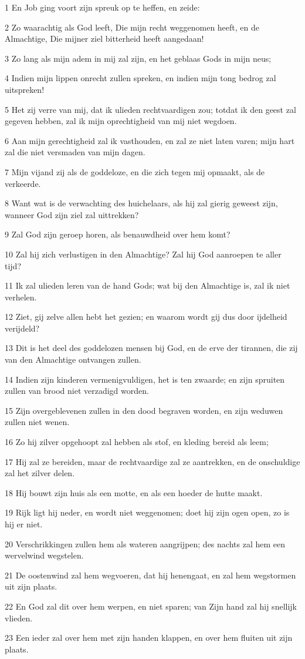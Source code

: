 \par 1 En Job ging voort zijn spreuk op te heffen, en zeide:
\par 2 Zo waarachtig als God leeft, Die mijn recht weggenomen heeft, en de Almachtige, Die mijner ziel bitterheid heeft aangedaan!
\par 3 Zo lang als mijn adem in mij zal zijn, en het geblaas Gods in mijn neus;
\par 4 Indien mijn lippen onrecht zullen spreken, en indien mijn tong bedrog zal uitspreken!
\par 5 Het zij verre van mij, dat ik ulieden rechtvaardigen zou; totdat ik den geest zal gegeven hebben, zal ik mijn oprechtigheid van mij niet wegdoen.
\par 6 Aan mijn gerechtigheid zal ik vasthouden, en zal ze niet laten varen; mijn hart zal die niet versmaden van mijn dagen.
\par 7 Mijn vijand zij als de goddeloze, en die zich tegen mij opmaakt, als de verkeerde.
\par 8 Want wat is de verwachting des huichelaars, als hij zal gierig geweest zijn, wanneer God zijn ziel zal uittrekken?
\par 9 Zal God zijn geroep horen, als benauwdheid over hem komt?
\par 10 Zal hij zich verlustigen in den Almachtige? Zal hij God aanroepen te aller tijd?
\par 11 Ik zal ulieden leren van de hand Gods; wat bij den Almachtige is, zal ik niet verhelen.
\par 12 Ziet, gij zelve allen hebt het gezien; en waarom wordt gij dus door ijdelheid verijdeld?
\par 13 Dit is het deel des goddelozen mensen bij God, en de erve der tirannen, die zij van den Almachtige ontvangen zullen.
\par 14 Indien zijn kinderen vermenigvuldigen, het is ten zwaarde; en zijn spruiten zullen van brood niet verzadigd worden.
\par 15 Zijn overgeblevenen zullen in den dood begraven worden, en zijn weduwen zullen niet wenen.
\par 16 Zo hij zilver opgehoopt zal hebben als stof, en kleding bereid als leem;
\par 17 Hij zal ze bereiden, maar de rechtvaardige zal ze aantrekken, en de onschuldige zal het zilver delen.
\par 18 Hij bouwt zijn huis als een motte, en als een hoeder de hutte maakt.
\par 19 Rijk ligt hij neder, en wordt niet weggenomen; doet hij zijn ogen open, zo is hij er niet.
\par 20 Verschrikkingen zullen hem als wateren aangrijpen; des nachts zal hem een wervelwind wegstelen.
\par 21 De oostenwind zal hem wegvoeren, dat hij henengaat, en zal hem wegstormen uit zijn plaats.
\par 22 En God zal dit over hem werpen, en niet sparen; van Zijn hand zal hij snellijk vlieden.
\par 23 Een ieder zal over hem met zijn handen klappen, en over hem fluiten uit zijn plaats.

